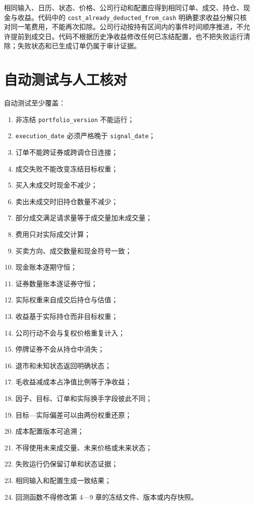 相同输入、日历、状态、价格、公司行动和配置应得到相同订单、成交、持仓、现金与收益。代码中的 \texttt{cost\_already\_deducted\_from\_cash} 明确要求收益分解只核对同一笔费用，不能再次扣除。公司行动按持有区间内的事件时间顺序推进，不允许提前到成交日。代码不根据历史净收益修改任何已冻结配置，也不把失败运行清除；失败状态和已生成订单仍属于审计证据。

\section{自动测试与人工核对}

自动测试至少覆盖：

\begin{enumerate}
  \item 非冻结 \texttt{portfolio\_version} 不能运行；
  \item \texttt{execution\_date} 必须严格晚于 \texttt{signal\_date}；
  \item 订单不能跨证券或跨调仓日连接；
  \item 成交失败不能改变冻结目标权重；
  \item 买入未成交时现金不减少；
  \item 卖出未成交时旧持仓数量不减少；
  \item 部分成交满足请求量等于成交量加未成交量；
  \item 费用只对实际成交计算；
  \item 买卖方向、成交数量和现金符号一致；
  \item 现金账本逐期守恒；
  \item 证券数量账本逐证券守恒；
  \item 实际权重来自成交后持仓与估值；
  \item 收益基于实际持仓而非目标权重；
  \item 公司行动不会与复权价格重复计入；
  \item 停牌证券不会从持仓中消失；
  \item 退市和未知状态返回明确状态；
  \item 毛收益减成本占净值比例等于净收益；
  \item 因子、目标、订单和实际换手字段彼此不同；
  \item 目标---实际偏差可以由两份权重还原；
  \item 成本配置版本可追溯；
  \item 不得使用未来成交量、未来价格或未来状态；
  \item 失败运行仍保留订单和状态证据；
  \item 相同输入和配置生成一致结果；
  \item 回测函数不得修改第 4---9 章的冻结文件、版本或内存快照。
\end{enumerate}

